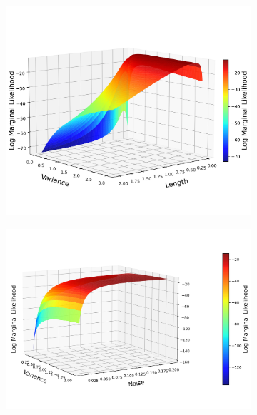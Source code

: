 \documentclass{article}
\begin{document}
\begin{figure}[H]
    \centering
    \begin{subfigure}[b]{0.4\textwidth}
        \centering
        \includegraphics[width=\textwidth]{LatexPlots/1dplots/Variancevslength.png}
    \end{subfigure}
    \hspace{0.05\textwidth}
    \begin{subfigure}[b]{0.4\textwidth}
        \centering
        \includegraphics[width=\textwidth]{LatexPlots/1dplots/Variancevsnoise.png}
    \end{subfigure}
    \vspace{0.05em}

\end{figure}
\end{document}
